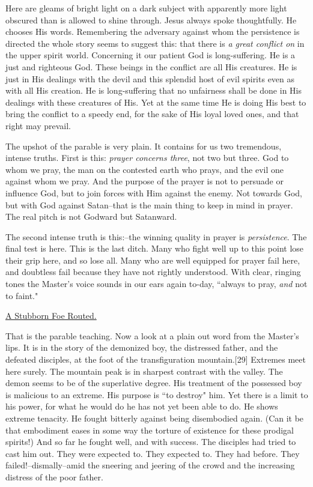 Here are gleams of bright light on a dark subject with apparently more
light obscured than is allowed to shine through. Jesus always spoke
thoughtfully. He chooses His words. Remembering the adversary against whom
the persistence is directed the whole story seems to suggest this: that
there is \textit{a great conflict on} in the upper spirit world. Concerning it
our patient God is long-suffering. He is a just and righteous God. These
beings in the conflict are all His creatures. He is just in His dealings
with the devil and this splendid host of evil spirits even as with all His
creation. He is long-suffering that no unfairness shall be done in His
dealings with these creatures of His. Yet at the same time He is doing His
best to bring the conflict to a speedy end, for the sake of His loyal
loved ones, and that right may prevail.

The upshot of the parable is very plain. It contains for us two
tremendous, intense truths. First is this: \textit{prayer concerns three}, not
two but three. God to whom we pray, the man on the contested earth who
prays, and the evil one against whom we pray. And the purpose of the
prayer is not to persuade or influence God, but to join forces with Him
against the enemy. Not towards God, but with God against Satan--that is
the main thing to keep in mind in prayer. The real pitch is not Godward
but Satanward.

The second intense truth is this:--the winning quality in prayer is
\textit{persistence}. The final test is here. This is the last ditch. Many who
fight well up to this point lose their grip here, and so lose all. Many
who are well equipped for prayer fail here, and doubtless fail because
they have not rightly understood. With clear, ringing tones the Master's
voice sounds in our ears again to-day, ``always to pray, \textit{and} not to
faint."



\underline{A Stubborn Foe Routed.}


That is the parable teaching. Now a look at a plain out word from the
Master's lips. It is in the story of the demonized boy, the distressed
father, and the defeated disciples, at the foot of the transfiguration
mountain.[29] Extremes meet here surely. The mountain peak is in sharpest
contrast with the valley. The demon seems to be of the superlative degree.
His treatment of the possessed boy is malicious to an extreme. His purpose
is ``to destroy" him. Yet there is a limit to his power, for what he would
do he has not yet been able to do. He shows extreme tenacity. He fought
bitterly against being disembodied again. (Can it be that embodiment eases
in some way the torture of existence for these prodigal spirits!) And so
far he fought well, and with success. The disciples had tried to cast him
out. They were expected to. They expected to. They had before. They
failed!--dismally--amid the sneering and jeering of the crowd and the
increasing distress of the poor father.

